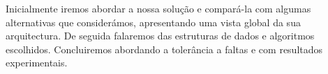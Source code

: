 
Inicialmente iremos abordar a nossa solução e compará-la com algumas alternativas que considerámos, apresentando uma vista global da sua arquitectura. De seguida falaremos das estruturas de dados e algoritmos escolhidos. Concluiremos abordando a tolerância a faltas e com resultados experimentais.